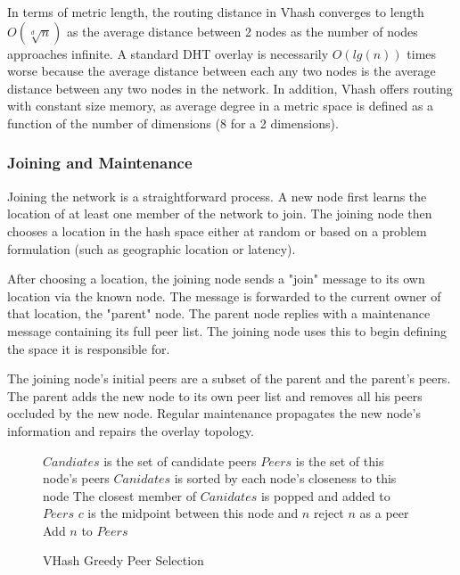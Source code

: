 \documentclass{article}
\begin{document}
In terms of metric length, the routing distance in Vhash converges to length $O(\sqrt[d]{n})$ as the average distance between 2 nodes as the number of nodes approaches infinite. A standard DHT overlay is necessarily $O(lg(n))$ times worse because the average distance between each any two nodes is the average distance between any two nodes in the network. In addition, Vhash offers routing with constant size memory, as average degree in a metric space is defined as a function of the number of dimensions (8 for a 2 dimensions). 

\subsubsection*{Joining and Maintenance}
Joining the network is a straightforward process. A new node first learns the location of at least one member of the network to join. The joining node then chooses a location in the hash space either at random or based on a problem formulation (such as geographic location or latency).


After choosing a location, the joining node sends a "join" message to its own location via the known node.
The message is forwarded to the current owner of that location, the "parent" node.
The parent node replies with a maintenance message containing its full peer list. The joining node uses this to begin defining the space it is responsible for. 

The joining node's initial peers are a subset of the parent and the parent's peers. The parent adds the new node to its own peer list and removes all his peers occluded by the new node.  Regular maintenance propagates the new node's information and repairs the overlay topology. 

\begin{wrapfigure}{l}{0.5\textwidth}
\begin{minipage}{0.5\textwidth}
\begin{algorithm}[H]

\caption{VHash Greedy Peer Selection}
\label{peer}
{\footnotesize

\begin{algorithmic}[1]  %
	\STATE $Candiates$ is the set of candidate peers
    \STATE $Peers$ is the set of this node's peers
    \STATE $Canidates$ is sorted by each node's closeness to this node
    \STATE The closest member of $Canidates$ is popped and added to $Peers$
    	\STATE $c$ is the midpoint between this node and $n$
        	\STATE reject $n$ as a peer
        \ELSE
        	\STATE Add $n$ to $Peers$
        \ENDIF
    \ENDFOR
\end{algorithmic}
}
\end{algorithm}
    \end{minipage}
  \end{wrapfigure}
\end{document}
